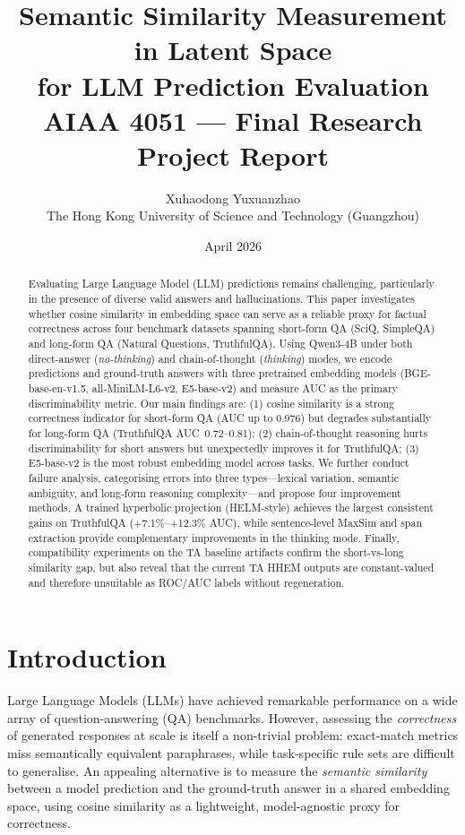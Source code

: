 \documentclass[11pt,a4paper]{article}
\title{%
  \textbf{Semantic Similarity Measurement in Latent Space}\\
  \textbf{for LLM Prediction Evaluation}\\[0.4em]
  \large AIAA 4051 — Final Research Project Report
}
\author{
  Xuhaodong \quad Yuxuanzhao \\[0.2em]
  \small The Hong Kong University of Science and Technology (Guangzhou)
}
\date{April 2026}
\begin{document}
\maketitle
\thispagestyle{empty}

\begin{abstract}
Evaluating Large Language Model (LLM) predictions remains challenging, particularly
in the presence of diverse valid answers and hallucinations.
This paper investigates whether cosine similarity in embedding space can serve as a
reliable proxy for factual correctness across four benchmark datasets spanning
short-form QA (SciQ, SimpleQA) and long-form QA (Natural Questions, TruthfulQA).
Using Qwen3-4B under both direct-answer (\emph{no-thinking}) and chain-of-thought
(\emph{thinking}) modes, we encode predictions and ground-truth answers with three
pretrained embedding models (BGE-base-en-v1.5, all-MiniLM-L6-v2, E5-base-v2) and
measure AUC as the primary discriminability metric.
Our main findings are: (1) cosine similarity is a strong correctness indicator for
short-form QA (AUC up to 0.976) but degrades substantially for long-form QA
(TruthfulQA AUC~0.72–0.81); (2) chain-of-thought reasoning hurts discriminability
for short answers but unexpectedly improves it for TruthfulQA; (3) E5-base-v2 is the
most robust embedding model across tasks.
We further conduct failure analysis, categorising errors into three types—lexical
variation, semantic ambiguity, and long-form reasoning complexity—and propose four
improvement methods. A trained hyperbolic projection (HELM-style) achieves the
largest consistent gains on TruthfulQA (+7.1\%--+12.3\% AUC), while sentence-level
MaxSim and span extraction provide complementary improvements in the thinking mode.
Finally, compatibility experiments on the TA baseline artifacts confirm the
short-vs-long similarity gap, but also reveal that the current TA HHEM outputs are
constant-valued and therefore unsuitable as ROC/AUC labels without regeneration.
\end{abstract}

\newpage
\tableofcontents
\newpage

\section{Introduction}
\label{sec:intro}

Large Language Models (LLMs) have achieved remarkable performance on a wide array of
question-answering (QA) benchmarks.
However, assessing the \emph{correctness} of generated responses at scale is itself a
non-trivial problem: exact-match metrics miss semantically equivalent paraphrases,
while task-specific rule sets are difficult to generalise.
An appealing alternative is to measure the \emph{semantic similarity} between a model
prediction and the ground-truth answer in a shared embedding space, using cosine
similarity as a lightweight, model-agnostic proxy for correctness.
\end{document}
